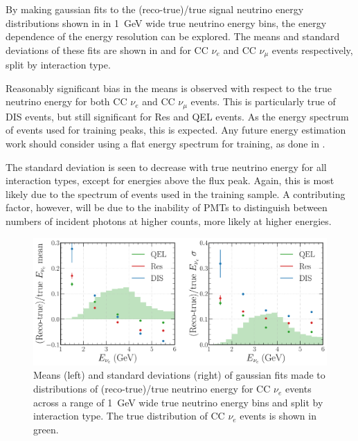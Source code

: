 By making gaussian fits to the (reco-true)/true signal neutrino energy distributions shown in
 in \SI{1}{GeV} wide true neutrino energy bins, the energy
dependence of the energy resolution can be explored. The means and standard deviations of these
fits are shown in  and  for CC
$\nu_{e}$ and CC $\nu_{\mu}$ events respectively, split by interaction type.

Reasonably significant bias in the means is observed with respect to the true neutrino energy for
both CC $\nu_{e}$ and CC $\nu_{\mu}$ events. This is particularly true of DIS events, but still
significant for Res and QEL events. As the energy spectrum of events used for training peaks, this
is expected. Any future energy estimation work should consider using a flat energy spectrum for
training, as done in .

The standard deviation is seen to decrease with true neutrino energy for all interaction types,
except for energies above the flux peak. Again, this is most likely due to the spectrum of events
used in the training sample. A contributing factor, however, will be due to the inability of PMTs
to distinguish between numbers of incident photons at higher counts, more likely at higher
energies.

\begin{figure} %
    \includegraphics[width=\textwidth]{diagrams/7-results/final_energy_nuel.pdf}
    \caption[Means and standard deviations of fits to $\nu_{e}$ energy distributions]
    {Means (left) and standard deviations (right) of gaussian fits made to distributions of
        (reco-true)/true neutrino energy for CC $\nu_{e}$ events across a range of \SI{1}{GeV}
        wide true neutrino energy bins and split by interaction type. The true distribution of CC
        $\nu_{e}$ events is shown in green.}
    \label{fig:final_energy_nuel}
\end{figure}

